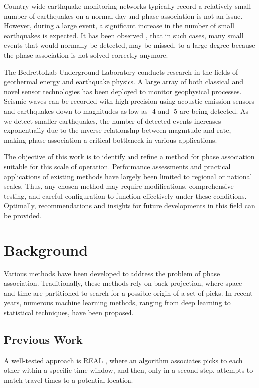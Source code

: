 \documentclass{scrreprt}
\begin{document}
Country-wide earthquake monitoring networks typically record a relatively small number of earthquakes on a normal day and phase association is not an issue. However, during a large event, a significant increase in the number of small earthquakes is expected. It has been observed \citep{amatrice}, that in such cases, many small events that would normally be detected, may be missed, to a large degree because the phase association is not solved correctly anymore.

The BedrettoLab Underground Laboratory conducts research in the fields of geothermal energy and earthquake physics. A large array of both classical and novel sensor technologies has been deployed to monitor geophysical processes. Seismic waves can be recorded with high precision using acoustic emission sensors and earthquakes down to magnitudes as low as -4 and -5 are being detected. As we detect smaller earthquakes, the number of detected events increases exponentially due to the inverse relationship between magnitude and rate, making phase association a critical bottleneck in various applications.

The objective of this work is to identify and refine a method for phase association suitable for this scale of operation. Performance assessments and practical applications of existing methods have largely been limited to regional or national scales. Thus, any chosen method may require modifications, comprehensive testing, and careful configuration to function effectively under these conditions. Optimally, recommendations and insights for future developments in this field can be provided.

\chapter{Background}

Various methods have been developed to address the problem of phase association. Traditionally, these methods rely on back-projection, where space and time are partitioned to search for a possible origin of a set of picks. In recent years, numerous machine learning methods, ranging from deep learning to statistical techniques, have been proposed.

\section{Previous Work}

A well-tested approach is REAL \citep{real}, where an algorithm associates picks to each other within a specific time window, and then, only in a second step, attempts to match travel times to a potential location.
\end{document}
